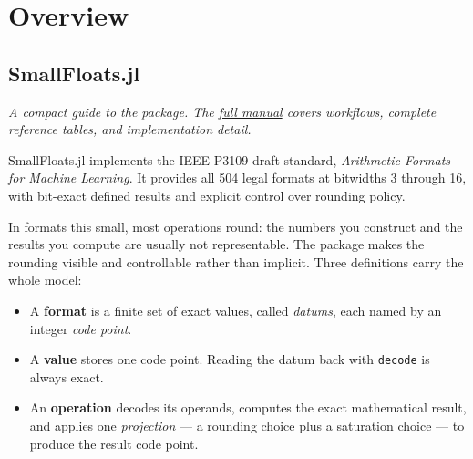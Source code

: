 \newcommand{\DocMainTitle}{SmallFloats.jl Compact Guide}
\newcommand{\DocVersion}{0.4.0}
\newcommand{\DocAuthors}{Jeffrey Sarnoff}
\newcommand{\JuliaVersion}{1.12.7}




\part{Overview}


\chapter{SmallFloats.jl}



\label{2801651161961906345}{}


\emph{A compact guide to the package. The \href{https://JeffreySarnoff.github.io/SmallFloats.jl}{full manual} covers workflows, complete reference tables, and implementation detail.}



SmallFloats.jl implements the IEEE P3109 draft standard, \emph{Arithmetic Formats for Machine Learning}. It provides all 504 legal formats at bitwidths 3 through 16, with bit-exact defined results and explicit control over rounding policy.



In formats this small, most operations round: the numbers you construct and the results you compute are usually not representable. The package makes the rounding visible and controllable rather than implicit. Three definitions carry the whole model:



\begin{itemize}
\item A \textbf{format} is a finite set of exact values, called \emph{datums}, each named by an integer \emph{code point}.


\item A \textbf{value} stores one code point. Reading the datum back with \texttt{decode} is always exact.


\item An \textbf{operation} decodes its operands, computes the exact mathematical result, and applies one \emph{projection} — a rounding choice plus a saturation choice — to produce the result code point.

\end{itemize}



